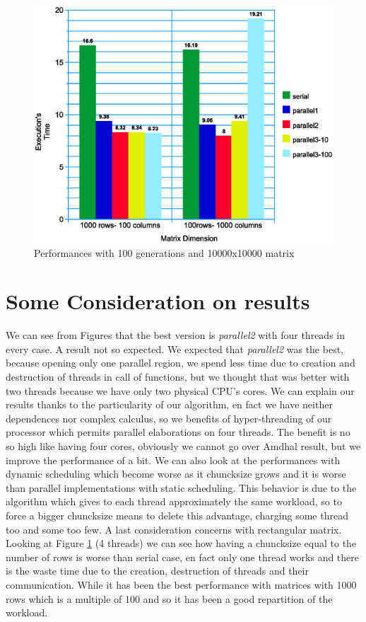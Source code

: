 \documentclass[a4paper,11pt,twoside]{report}
\begin{document}
\begin{figure}
	\centering
	\includegraphics[scale = 0.5]{matdim.eps}
	\caption{Performances with 100 generations and 10000x10000 matrix} \label{fig:7}
\end{figure}

\section{Some Consideration on results}
We can see from Figures that the best version is \emph{parallel2} with four threads in every case. A result not so expected. We expected that \emph{parallel2} was the best, because opening only one parallel region, we spend less time due to creation and destruction of threads in call of functions, but we thought that was better with two threads because we have only two physical CPU's cores. We can explain our results thanks to the particularity of our algorithm, en fact we have neither dependences nor complex calculus, so we benefits of hyper-threading of our processor which permits parallel elaborations on four threads. The benefit is no so high like having four cores, obviously we cannot go over Amdhal result, but we improve the performance of a bit. 
We can also look at the performances with dynamic scheduling which become worse as it chuncksize grows and it is worse than parallel implementations with static scheduling. This behavior is due to 
the algorithm which gives to each thread approximately the same workload, so to force a bigger chuncksize means to delete this advantage, charging some thread too and some too few. 
A last consideration concerns with rectangular matrix. Looking at Figure \ref{fig:7} (4 threads) we can see how having a chuncksize equal to the number of rows is worse than serial case, en fact only one thread works and there is the waste time due to the creation, destruction of threads and their communication. While it has been the best performance with matrices with 1000 rows which is a multiple of 100 and so it has been a good repartition of the workload.
\end{document}
